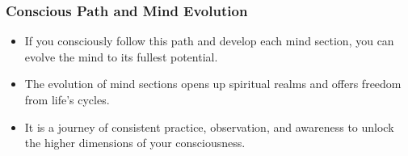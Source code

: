 \begin{frame}[fragile]\frametitle{Conscious Path and Mind Evolution}
    \begin{itemize}
        \item If you consciously follow this path and develop each mind section, you can evolve the mind to its fullest potential.
        \item The evolution of mind sections opens up spiritual realms and offers freedom from life's cycles.
        \item It is a journey of consistent practice, observation, and awareness to unlock the higher dimensions of your consciousness.
    \end{itemize}
\end{frame}
